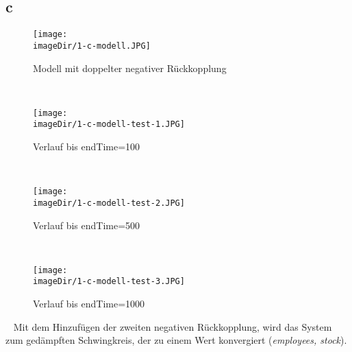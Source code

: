\subsection{c}
\begin{figure}[h]
	\centering
	\texttt{[image: \\imageDir/1-c-modell.JPG]}
	\caption{Modell mit doppelter negativer Rückkopplung}
	\label{fig:1-c-modell}
\end{figure}
\ \newpage

\begin{figure}[h]
	\centering
	\texttt{[image: \\imageDir/1-c-modell-test-1.JPG]}
	\caption{Verlauf bis endTime=100}
	\label{fig:1-c-modell-test-1}
\end{figure}
\ \newpage

\begin{figure}[h]
	\centering
	\texttt{[image: \\imageDir/1-c-modell-test-2.JPG]}
	\caption{Verlauf bis endTime=500}
	\label{fig:1-c-modell-test-2}
\end{figure}
\ \newpage

\begin{figure}[h]
\centering
\texttt{[image: \\imageDir/1-c-modell-test-3.JPG]}
\caption{Verlauf bis endTime=1000}
\label{fig:1-c-modell-test-3}
\end{figure}
\ \newline
Mit dem Hinzufügen der zweiten negativen Rückkopplung, wird das System zum gedämpften Schwingkreis, der zu einem Wert konvergiert (\emph{employees, stock}).
\newpage

